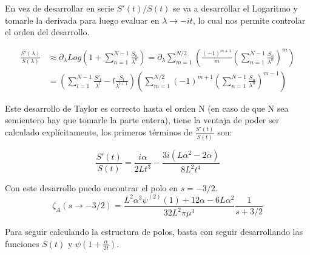 En vez de desarrollar en serie $S'(t) / S (t)$ se va a desarrollar el Logaritmo y tomarle la derivada para luego evaluar en $\lambda \rightarrow -i t$, lo cual nos permite controlar el orden del desarrollo.

\begin{equation}
\begin{aligned}
\frac{S'( \lambda)}{S( \lambda )} &\approx 
\partial _{\lambda} Log \left(
								1 + \sum _{n=1} ^{N-1}  \frac{S _n}{\lambda ^n}
								\right) =
\partial _{\lambda} 
\sum _{m = 1} ^{N/2} 
	\left(
	\frac{(-1) ^{m+1} }{m}
	\left(
		\sum _{n=1} ^{N-1} \frac{S _n}{\lambda ^n}
		\right) ^m 
	\right)  \\[10pt]
	&=
\left(								
	\sum _{l = 1} ^{N-1} 
	\frac{S' _l}{\lambda ^l} - l \frac{S _l}{\lambda ^{l+1}}
	\right)							
\left(
	\sum _{m = 1} ^{N/2} (-1) ^{m+1} 
	\left(
			\sum _{n=1} ^{N-1} \frac{S _n}{\lambda ^n}
			\right) ^{m-1}		
	\right)
\end{aligned}	
\end{equation}



Este desarrollo de Taylor es correcto hasta el orden N (en caso de que N sea semientero hay que tomarle la parte entera), tiene la ventaja de poder ser calculado explícitamente, los primeros términos de $\frac{S'(t)}{S(t)}$ son:

\begin{equation}
\frac{S'(t)}{S(t)} = 
\frac{i \alpha}{2 L t^3} -
\frac{3 i (L \alpha ^2 - 2 \alpha)}{8 L^2 t ^4}
\end{equation}




Con este desarrollo puedo encontrar el polo en $s=-3/2$.
\begin{equation}
\zeta _A (s \rightarrow -3/2) = 
\frac{L ^2 \alpha  ^3 \psi ^{(2)} (1) + 12   \alpha  - 6 L \alpha ^2}{32 L^2 \pi \mu ^3}
\frac{1}{s+3/2}
\end{equation}

Para seguir calculando la estructura de polos, basta con seguir desarrollando las funciones $S(t)$ y $\psi (1 + \frac{\alpha}{2 t})$.

